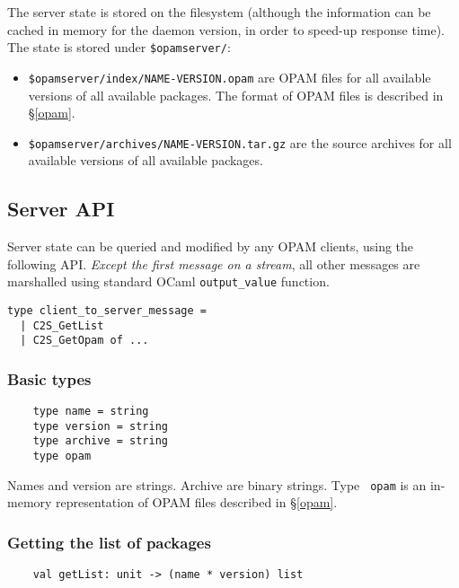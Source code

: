 \documentclass[a4paper,11pt]{article}
\begin{document}
The server state is stored on the filesystem (although the information
can be cached in memory for the daemon version, in order to speed-up
response time). The state is stored under {\tt \$opamserver/}:

\begin{itemize}

\item {\tt \$opamserver/index/NAME-VERSION.opam} are OPAM files
  for all available versions of all available packages. The format of
  OPAM files is described in \S\ref{opam}.

\item {\tt \$opamserver/archives/NAME-VERSION.tar.gz} are the
  source archives for all available versions of all available
  packages.

\end{itemize}

\subsection{Server API}
\label{api}

Server state can be queried and modified by any OPAM clients, using
the following API. {\em Except the first message on a stream}, all
other messages are marshalled using standard OCaml \verb-output_value-
function.

\begin{verbatim}
type client_to_server_message =
  | C2S_GetList
  | C2S_GetOpam of ...
\end{verbatim}


\subsubsection{Basic types}

\begin{verbatim}
    type name = string
    type version = string
    type archive = string
    type opam
\end{verbatim}

Names and version are strings. Archive are binary strings. Type {\tt
  opam} is an in-memory representation of OPAM files described in
\S\ref{opam}.


\subsubsection{Getting the list of packages}
\label{getList}

\begin{verbatim}
    val getList: unit -> (name * version) list
\end{verbatim}
\end{document}
